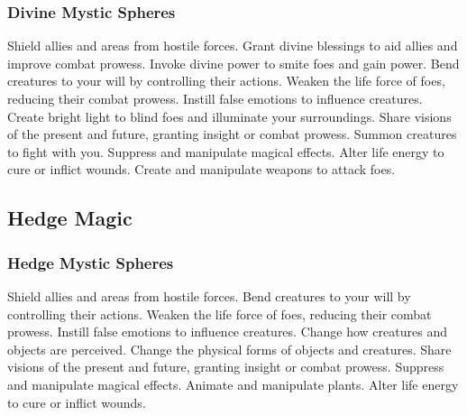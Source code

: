 \subsubsection{Divine Mystic Spheres}\label{Divine Mystic Spheres}
\begin{spelllist}
 Shield allies and areas from hostile forces.
 Grant divine blessings to aid allies and improve combat prowess.
 Invoke divine power to smite foes and gain power.
 Bend creatures to your will by controlling their actions.
 Weaken the life force of foes, reducing their combat prowess.
 Instill false emotions to influence creatures.
 Create bright light to blind foes and illuminate your surroundings.
 Share visions of the present and future, granting insight or combat prowess.
 Summon creatures to fight with you.
 Suppress and manipulate magical effects.
 Alter life energy to cure or inflict wounds.
 Create and manipulate weapons to attack foes.
\end{spelllist}



\small
\subsection{Hedge Magic}\label{Hedge Magic}
\subsubsection{Hedge Mystic Spheres}\label{Hedge Mystic Spheres}
\begin{spelllist}
 Shield allies and areas from hostile forces.
 Bend creatures to your will by controlling their actions.
 Weaken the life force of foes, reducing their combat prowess.
 Instill false emotions to influence creatures.
 Change how creatures and objects are perceived.
 Change the physical forms of objects and creatures.
 Share visions of the present and future, granting insight or combat prowess.
 Suppress and manipulate magical effects.
 Animate and manipulate plants.
 Alter life energy to cure or inflict wounds.
\end{spelllist}



